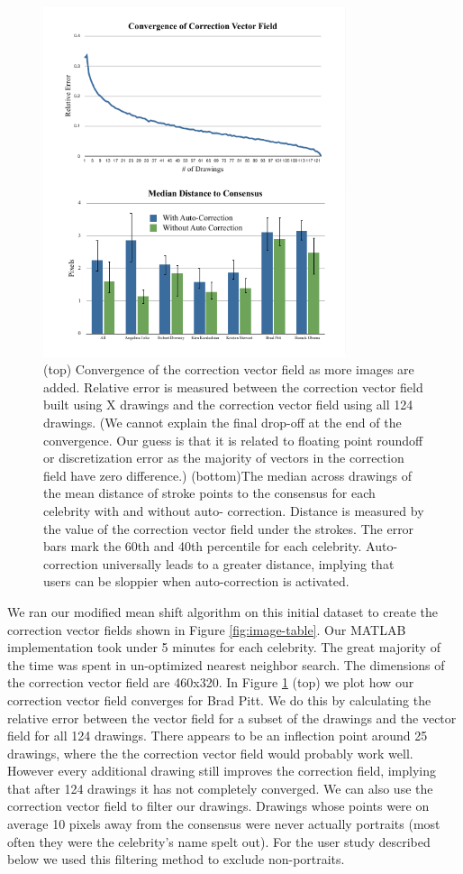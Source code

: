\begin{figure}[!t]
  \centering%
\includegraphics[width=3.5in]{./figures/userstudy/twoGraph.pdf}
  \caption{(top) Convergence of the correction vector field as more images are added. Relative error is measured between
the correction vector field built using X drawings and the correction vector field using all 124 drawings. (We cannot explain the final drop-off at the end of the convergence. Our guess is that it is related to floating point roundoff or discretization error as the majority of vectors in the correction field have zero difference.) (bottom)The
median across drawings of the mean distance of stroke points to the consensus for each celebrity with and without auto-
correction. Distance is measured by the value of the correction vector field under the strokes. The error bars mark the
60th and 40th percentile for each celebrity. Auto-correction universally leads to a greater distance, implying that users
can be sloppier when auto-correction is activated.}
  \label{fig:daf-two}
\end{figure}



We ran our modified mean shift algorithm on this initial dataset to create the correction vector fields shown in Figure \ref{fig:image-table}. Our MATLAB implementation took under 5 minutes for each celebrity.  The great majority of the time was spent in un-optimized nearest neighbor search. The dimensions of the correction vector field are 460x320. In Figure \ref{fig:daf-two} (top) we plot how our correction vector field converges for Brad Pitt. We do this by calculating the relative error between the vector field for a subset of the drawings and the vector field for all 124 drawings. There appears to be an inflection point around 25 drawings, where the the correction vector field would probably work well. However every additional drawing still improves the correction field, implying that after 124 drawings it has not completely converged. We can also use the correction vector field to filter our drawings. Drawings whose points were on average 10 pixels away from the consensus were never actually portraits (most often they were the celebrity's name spelt out). For the user study described below we used this filtering method to exclude non-portraits. 


